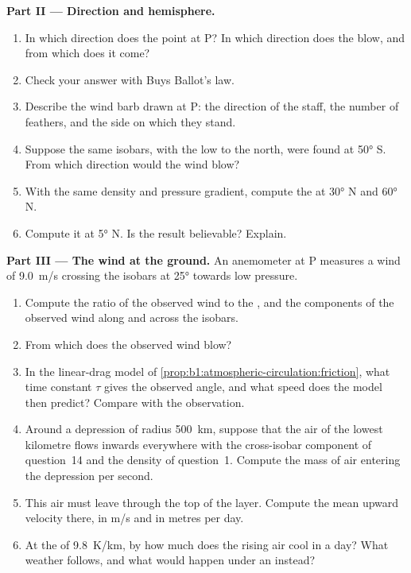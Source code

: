 \begin{problem}
\medskip
\noindent\textbf{Part II --- Direction and hemisphere.}
\begin{enumerate}[resume]
  \item In which direction does the  point at P? In which
        direction does the  blow, and from which  does it
        come?
  \item Check your answer with Buys Ballot's law.
  \item Describe the wind barb drawn at P: the direction of the staff, the number
        of feathers, and the side on which they stand.
  \item Suppose the same isobars, with the low to the north, were found at
        \ang{50} S. From which direction would the wind blow?
  \item With the same density and pressure gradient, compute the 
        at \ang{30} N and \ang{60} N.
  \item Compute it at \ang{5} N. Is the result believable? Explain.
\end{enumerate}

\medskip
\noindent\textbf{Part III --- The wind at the ground.} An anemometer at P measures a
wind of \qty{9.0}{m/s} crossing the isobars at \ang{25} towards low pressure.
\begin{enumerate}[resume]
  \item Compute the ratio of the observed wind to the , and the
        components of the observed wind along and across the isobars.
  \item From which  does the observed wind blow?
  \item In the linear-drag model of \cref{prop:b1:atmospheric-circulation:friction},
        what time constant $\tau$ gives the observed angle, and what speed does the
        model then predict? Compare with the observation.
  \item Around a depression of radius \qty{500}{km}, suppose that the air of the
        lowest kilometre flows inwards everywhere with the cross-isobar component
        of question~14 and the density of question~1. Compute the mass of air
        entering the depression per second.
  \item This air must leave through the top of the layer. Compute the mean upward
        velocity there, in \unit{m/s} and in metres per day.
  \item At the  of \qty{9.8}{K/km}, by how much does the
        rising air cool in a day? What weather follows, and what would happen
        under an  instead?
\end{enumerate}


\end{problem}
